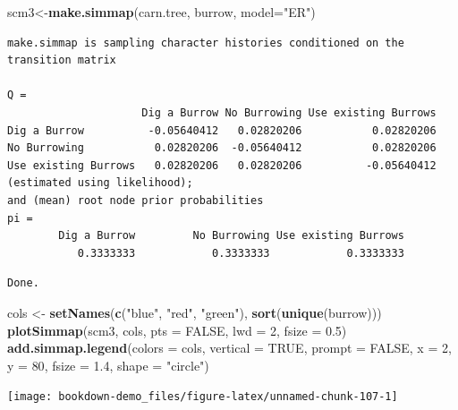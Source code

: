 \documentclass[
]{book}
\newenvironment{Shaded}{\begin{snugshade}}{\end{snugshade}}
\newcommand{\DataTypeTok}[1]{\textcolor[rgb]{0.13,0.29,0.53}{#1}}
\newcommand{\DecValTok}[1]{\textcolor[rgb]{0.00,0.00,0.81}{#1}}
\newcommand{\FloatTok}[1]{\textcolor[rgb]{0.00,0.00,0.81}{#1}}
\newcommand{\KeywordTok}[1]{\textcolor[rgb]{0.13,0.29,0.53}{\textbf{#1}}}
\newcommand{\NormalTok}[1]{#1}
\newcommand{\OtherTok}[1]{\textcolor[rgb]{0.56,0.35,0.01}{#1}}
\newcommand{\StringTok}[1]{\textcolor[rgb]{0.31,0.60,0.02}{#1}}
\begin{document}
\begin{Shaded}
\begin{Highlighting}[]
\NormalTok{scm3\textless{}{-}}\KeywordTok{make.simmap}\NormalTok{(carn.tree, burrow, }\DataTypeTok{model=}\StringTok{"ER"}\NormalTok{)}
\end{Highlighting}
\end{Shaded}

\begin{verbatim}
make.simmap is sampling character histories conditioned on the transition matrix

Q =
                     Dig a Burrow No Burrowing Use existing Burrows
Dig a Burrow          -0.05640412   0.02820206           0.02820206
No Burrowing           0.02820206  -0.05640412           0.02820206
Use existing Burrows   0.02820206   0.02820206          -0.05640412
(estimated using likelihood);
and (mean) root node prior probabilities
pi =
        Dig a Burrow         No Burrowing Use existing Burrows 
           0.3333333            0.3333333            0.3333333 
\end{verbatim}

\begin{verbatim}
Done.
\end{verbatim}

\begin{Shaded}
\begin{Highlighting}[]
\NormalTok{cols \textless{}{-}}\StringTok{ }\KeywordTok{setNames}\NormalTok{(}\KeywordTok{c}\NormalTok{(}\StringTok{"blue"}\NormalTok{, }\StringTok{"red"}\NormalTok{, }\StringTok{"green"}\NormalTok{), }\KeywordTok{sort}\NormalTok{(}\KeywordTok{unique}\NormalTok{(burrow)))}
\KeywordTok{plotSimmap}\NormalTok{(scm3, cols, }\DataTypeTok{pts =} \OtherTok{FALSE}\NormalTok{, }\DataTypeTok{lwd =} \DecValTok{2}\NormalTok{, }\DataTypeTok{fsize =} \FloatTok{0.5}\NormalTok{)}
\KeywordTok{add.simmap.legend}\NormalTok{(}\DataTypeTok{colors =}\NormalTok{ cols, }\DataTypeTok{vertical =} \OtherTok{TRUE}\NormalTok{, }\DataTypeTok{prompt =} \OtherTok{FALSE}\NormalTok{, }\DataTypeTok{x =} \DecValTok{2}\NormalTok{, }\DataTypeTok{y =} \DecValTok{80}\NormalTok{, }\DataTypeTok{fsize =} \FloatTok{1.4}\NormalTok{, }\DataTypeTok{shape =} \StringTok{"circle"}\NormalTok{)}
\end{Highlighting}
\end{Shaded}

\begin{center}\texttt{[image: bookdown-demo\_files/figure-latex/unnamed-chunk-107-1]} \end{center}
\end{document}
